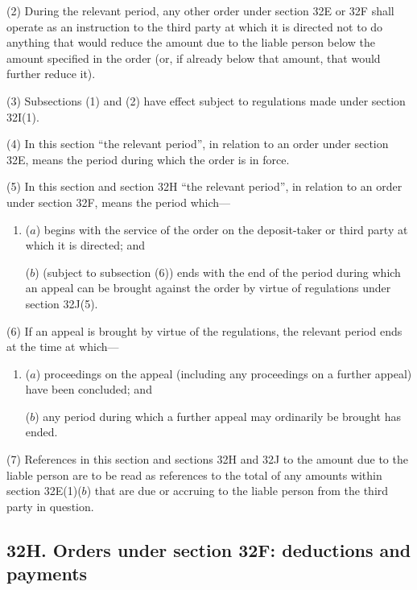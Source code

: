 \documentclass[a4paper]{article}
\begin{document}
(2)
During the relevant period, any other order under section 32E or 32F shall operate as an instruction to the third party at which it is directed not to do anything that would reduce the amount due to the liable person below the amount specified in the order (or, if already below that amount, that would further reduce it).

(3)
Subsections (1) and (2) have effect subject to regulations made under section 32I(1).

(4)
In this section “the relevant period”, in relation to an order under section 32E, means the period during which the order is in force.

(5)
In this section and section 32H “the relevant period”, in relation to an order under section 32F, means the period which---
\begin{enumerate}\item[]
($a$) begins with the service of the order on the deposit-taker or third party at which it is directed; and

($b$) (subject to subsection (6)) ends with the end of the period during which an appeal can be brought against the order by virtue of regulations under section 32J(5).
\end{enumerate}

(6) If an appeal is brought by virtue of the regulations, the relevant period ends at the time at which---
\begin{enumerate}\item[]
($a$) proceedings on the appeal (including any proceedings on a further appeal) have been concluded; and

($b$) any period during which a further appeal may ordinarily be brought has ended.
\end{enumerate}

(7) References in this section and sections 32H and 32J to the amount due to the liable person are to be read as references to the total of any amounts within section 32E(1)($b$) that are due or accruing to the liable person from the third party in question.


\subsection{32H. Orders under section 32F: deductions and payments}
\end{document}
